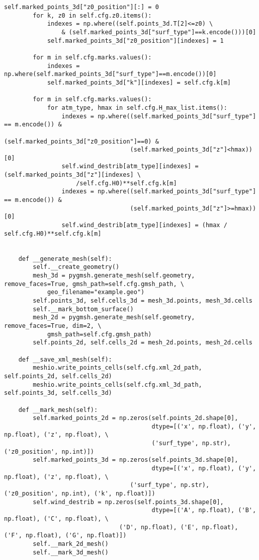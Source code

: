 \begin{lstlisting}[caption=Исходный код модуля генерации расчетной сетки и её маркировки, 
                    label={lst_meshgen_all}, basicstyle=\scriptsize]
        self.marked_points_3d["z0_position"][:] = 0
        for k, z0 in self.cfg.z0.items():
            indexes = np.where((self.points_3d.T[2]<=z0) \ 
                & (self.marked_points_3d["surf_type"]==k.encode()))[0]
            self.marked_points_3d["z0_position"][indexes] = 1

        for m in self.cfg.marks.values():
            indexes = np.where(self.marked_points_3d["surf_type"]==m.encode())[0]
            self.marked_points_3d["k"][indexes] = self.cfg.k[m]

        for m in self.cfg.marks.values():
            for atm_type, hmax in self.cfg.H_max_list.items():
                indexes = np.where((self.marked_points_3d["surf_type"] == m.encode()) &
                                   (self.marked_points_3d["z0_position"]==0) &
                                   (self.marked_points_3d["z"]<hmax))[0]
                self.wind_destrib[atm_type][indexes] = (self.marked_points_3d["z"][indexes] \ 
                    /self.cfg.H0)**self.cfg.k[m]
                indexes = np.where((self.marked_points_3d["surf_type"] == m.encode()) &
                                   (self.marked_points_3d["z"]>=hmax))[0]
                self.wind_destrib[atm_type][indexes] = (hmax / self.cfg.H0)**self.cfg.k[m]


    def __generate_mesh(self):
        self.__create_geometry()
        mesh_3d = pygmsh.generate_mesh(self.geometry, remove_faces=True, gmsh_path=self.cfg.gmsh_path, \
            geo_filename="example.geo")
        self.points_3d, self.cells_3d = mesh_3d.points, mesh_3d.cells
        self.__mark_bottom_surface()
        mesh_2d = pygmsh.generate_mesh(self.geometry, remove_faces=True, dim=2, \ 
            gmsh_path=self.cfg.gmsh_path)
        self.points_2d, self.cells_2d = mesh_2d.points, mesh_2d.cells

    def __save_xml_mesh(self):
        meshio.write_points_cells(self.cfg.xml_2d_path, self.points_2d, self.cells_2d)
        meshio.write_points_cells(self.cfg.xml_3d_path, self.points_3d, self.cells_3d)

    def __mark_mesh(self):
        self.marked_points_2d = np.zeros(self.points_2d.shape[0],
                                         dtype=[('x', np.float), ('y', np.float), ('z', np.float), \
                                         ('surf_type', np.str), ('z0_position', np.int)])
        self.marked_points_3d = np.zeros(self.points_3d.shape[0],
                                         dtype=[('x', np.float), ('y', np.float), ('z', np.float), \ 
                                   ('surf_type', np.str), ('z0_position', np.int), ('k', np.float)])
        self.wind_destrib = np.zeros(self.points_3d.shape[0],
                                         dtype=[('A', np.float), ('B', np.float), ('C', np.float), \ 
                                ('D', np.float), ('E', np.float), ('F', np.float), ('G', np.float)])
        self.__mark_2d_mesh()
        self.__mark_3d_mesh()


\end{lstlisting}
